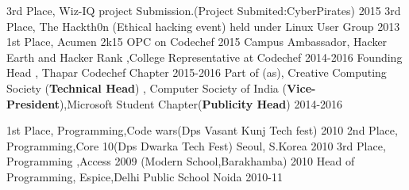 \begin{cvhonors}
  \cvhonor
    {3rd Place,}
    {Wiz-IQ project Submission.(Project Submited:CyberPirates)}
    {}
    {2015}
  \cvhonor
    {3rd Place,}
    {The Hackth0n (Ethical hacking event) held under Linux User Group}
    {}
    {2013}
  \cvhonor
    {1st Place,}
    {Acumen 2k15 OPC on Codechef}
    {}
    {2015} 
    \cvhonor
    {Campus Ambassador,}
    {Hacker Earth and Hacker Rank ,College Representative at Codechef}
    {}
    {2014-2016}
  \cvhonor
    {Founding Head ,}
    {Thapar Codechef Chapter}
    {}
    {2015-2016}
  \cvhonor
    {Part of (as),}
    {Creative Computing Society (\textbf{Technical Head}) , Computer Society of India (\textbf{Vice-President}),Microsoft Student Chapter(\textbf{Publicity Head})}
    {}
    {2014-2016}
\end{cvhonors}

\begin{cvhonors}
  \cvhonor
    {1st Place,}
    {Programming,Code wars(Dps Vasant Kunj Tech fest) }
    {}
    {2010}
  \cvhonor
    {2nd Place,}
    {Programming,Core 10(Dps Dwarka Tech Fest) }
    {Seoul, S.Korea}
    {2010}
  \cvhonor
    {3rd Place,}
    {Programming ,Access 2009 (Modern School,Barakhamba)}
    {}
    {2010}
  \cvhonor
    {Head of Programming,}
    {Espice,Delhi Public School Noida}
    {}
    {2010-11}
\end{cvhonors}
